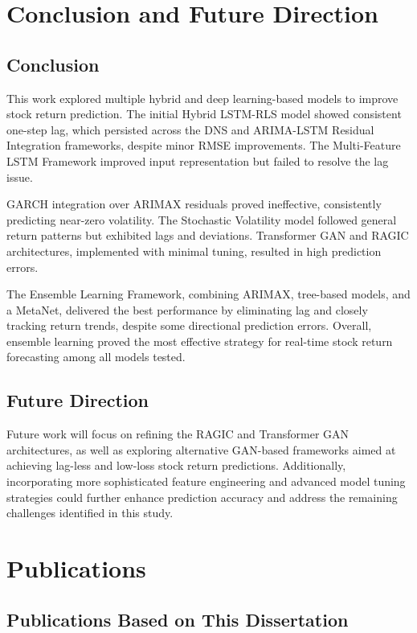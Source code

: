 \chapter{Conclusion and Future Direction}

\section{Conclusion}
This work explored multiple hybrid and deep learning-based models to improve stock return prediction. The initial Hybrid LSTM-RLS model showed consistent one-step lag, which persisted across the DNS and ARIMA-LSTM Residual Integration frameworks, despite minor RMSE improvements. The Multi-Feature LSTM Framework improved input representation but failed to resolve the lag issue.

GARCH integration over ARIMAX residuals proved ineffective, consistently predicting near-zero volatility. The Stochastic Volatility model followed general return patterns but exhibited lags and deviations. Transformer GAN and RAGIC architectures, implemented with minimal tuning, resulted in high prediction errors.

The Ensemble Learning Framework, combining ARIMAX, tree-based models, and a MetaNet, delivered the best performance by eliminating lag and closely tracking return trends, despite some directional prediction errors. Overall, ensemble learning proved the most effective strategy for real-time stock return forecasting among all models tested.

\section{Future Direction}
Future work will focus on refining the RAGIC and Transformer GAN architectures, as well as exploring alternative GAN-based frameworks aimed at achieving lag-less and low-loss stock return predictions. Additionally, incorporating more sophisticated feature engineering and advanced model tuning strategies could further enhance prediction accuracy and address the remaining challenges identified in this study.


\chapter{Publications}

\section*{Publications Based on This Dissertation}

